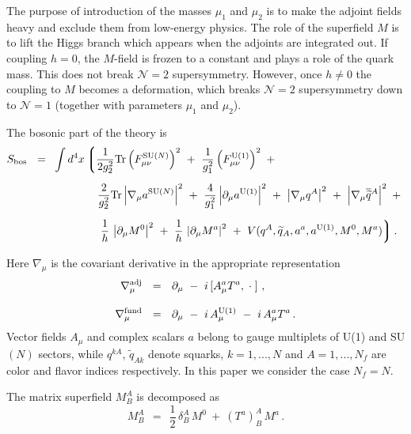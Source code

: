 \documentclass[12pt]{article}
\def\Tr{{\rm Tr}}
\newcommand{\ntwo}{${\mathcal N}=2$ }
\newcommand{\none}{${\mathcal N}=1$ }
\newcommand{\p}{\partial}
\newcommand{\wt}{\widetilde}
\newcommand{\ov}{\overline}
\newcommand{\lgr}{\left\lgroup}
\newcommand{\rgr}{\right\rgroup}
\newcommand{\aU}{a^{\rm U(1)}}
\newcommand{\aN}{a^\text{SU($N$)}}
\begin{document}
The purpose of introduction of the masses $ \mu_1 $ and $ \mu_2 $ is to make the adjoint fields
heavy and exclude them from low-energy physics.
The role of the superfield $ M $ is to lift the Higgs branch which appears when
the adjoints are integrated out. If coupling $h=0$, the $M$-field is frozen to a constant 
and plays a role of the quark mass. This does not break \ntwo supersymmetry. However,
once $h\neq 0$ the coupling to $M$ becomes a deformation, which breaks \ntwo supersymmetry
down to \none (together with parameters $\mu_1$ and $\mu_2$).

The bosonic part of the theory is
\begin{align}
%
\label{theory}
	S_{\rm bos} ~~=~~ & \int d^4 x 
		\lgr
			\frac{1}{2g_2^2}\Tr \left(F_{\mu\nu}^\text{SU($N$)}\right)^2  ~+~
			\frac{1}{g_1^2} \left(F_{\mu\nu}^{\rm U(1)}\right)^2 ~+~ 
			\right. 
			\\[2mm]
%
\notag
		&
			\phantom{\int d^4 x \lgr\right.\,}
			\frac{2}{g_2^2}\Tr \left|\nabla_\mu \aN \right|^2   ~+~
			\frac{4}{g_1^2} \left|\p_\mu \aU \right|^2
			~+~
			\left| \nabla_\mu q^A \right|^2 ~+~ \left|\nabla_\mu \ov{\wt{q}}{}^A \right|^2 
			~+~
			\\[2mm]
%
\notag
		&
			\phantom{\int d^4 x \lgr\right.\,}
		\left.
			\frac{1}{h}\, \left| \p_\mu M^0 \right|^2  ~+~
			\frac{1}{h}\, \left| \p_\mu M^a \right|^2 ~+~
			V(q^A, \wt{q}{}_A, a^a, \aU, M^0, M^a)
		\rgr .
\end{align}

	Here $ \nabla_\mu $ is the covariant derivative in the appropriate representation
\begin{align*}
%
	\nabla_\mu^{\rm adj} & ~~=~~ \p_\mu  ~-~ i\, [ A_\mu^a T^a, \;\cdot\;]~, \\[3mm]
%
	\nabla_\mu^{\rm fund} & ~~=~~ \p_\mu ~-~ i\,A^{\rm U(1)}_\mu ~-~ i\, A_\mu^a T^a\,.
\end{align*}
Vector fields $A_{\mu}$ and complex scalars $a$ belong to gauge multiplets of U(1) and SU$(N)$ sectors, while $q^{kA}$, $\tilde{q}_{Ak}$ denote squarks, $k=1,...,N$ and $A=1,...,N_f$ are
color and flavor indices respectively. In this paper we consider the case $N_f=N$.

	The matrix superfield $ M^A_B $ is decomposed as 
\[
	M^A_B ~~=~~ \frac{1}{2}\,\delta^A_B\, M^0  ~+~ (T^a)^A_B\, M^a\,.
\]
\end{document}
